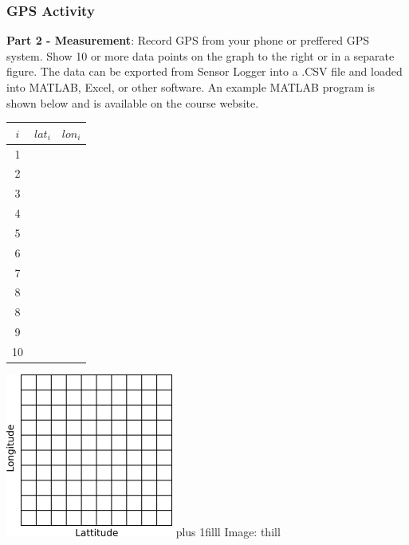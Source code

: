 \documentclass[fleqn]{beamer} %
\newcommand{\sectionIsubsectionIVtitle}{GPS Activity}
\newcommand{\btVFill}{\vskip0pt plus 1filll}
\begin{document}
			\begin{frame}
				\frametitle{\sectionIsubsectionIVtitle}

				\scriptsize
				{\bf Part 2 - Measurement}: Record GPS from your phone or preffered GPS system. Show 10 or more data points on the graph to the right or in a separate figure. The data can be exported from Sensor Logger into a .CSV file and loaded into MATLAB, Excel, or other software. An example MATLAB program is shown below and is available on the course website.   \\
				
				\begin{multicols}{2}

					\setlength{\tabcolsep}{20pt}
					\renewcommand{\arraystretch}{1.0}
					\begin{tabular}{|c|c|c|} \hline
					$i$ & $lat_i$ & $lon_i$ \\\hline
					  1  & &              \\ \hline
					  2  & &              \\ \hline
					  3  & &              \\ \hline
					  4  & &              \\ \hline
					  5  & &              \\ \hline
					  6  & &              \\ \hline
					  7  & &              \\ \hline
					  8  & &              \\ \hline
					  8  & &              \\ \hline		
					  9  & &              \\ \hline
		             10  & &              \\ \hline
					\end{tabular}

					\includegraphics[scale=0.8]{images/lat_lon_grid.png}
					\btVFill
					{\tiny Image: thill}
				\end{multicols}	
				
			\end{frame}
	
\end{document}
